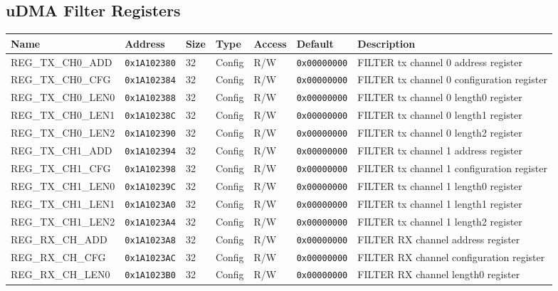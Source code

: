 
\subsection{uDMA Filter Registers}
{\small
\begin{tabularx}{\textwidth}{|l|l|l|l|l|l|X|}
  \hline
  \textbf{Name} & \textbf{Address}  & \textbf{Size} & \textbf{Type} & \textbf{Access} & \textbf{Default} & \textbf{Description} \\
  \hline
  REG\_TX\_CH0\_ADD & \texttt{0x1A102380} & 32 & Config & R/W & \texttt{0x00000000} & FILTER tx channel 0 address register\\
  \hline
  REG\_TX\_CH0\_CFG & \texttt{0x1A102384} & 32 & Config & R/W & \texttt{0x00000000} & FILTER tx channel 0 configuration register\\
  \hline
  REG\_TX\_CH0\_LEN0 & \texttt{0x1A102388} & 32 & Config & R/W & \texttt{0x00000000} & FILTER tx channel 0 length0 register\\
  \hline
  REG\_TX\_CH0\_LEN1 & \texttt{0x1A10238C} & 32 & Config & R/W & \texttt{0x00000000} & FILTER tx channel 0 length1 register\\
  \hline
  REG\_TX\_CH0\_LEN2 & \texttt{0x1A102390} & 32 & Config & R/W & \texttt{0x00000000} & FILTER tx channel 0 length2 register\\
  \hline
  REG\_TX\_CH1\_ADD & \texttt{0x1A102394} & 32 & Config & R/W & \texttt{0x00000000} & FILTER tx channel 1 address register\\
  \hline
  REG\_TX\_CH1\_CFG & \texttt{0x1A102398} & 32 & Config & R/W & \texttt{0x00000000} & FILTER tx channel 1 configuration register\\
  \hline
  REG\_TX\_CH1\_LEN0 & \texttt{0x1A10239C} & 32 & Config & R/W & \texttt{0x00000000} & FILTER tx channel 1 length0 register\\
  \hline
  REG\_TX\_CH1\_LEN1 & \texttt{0x1A1023A0} & 32 & Config & R/W & \texttt{0x00000000} & FILTER tx channel 1 length1 register\\
  \hline
  REG\_TX\_CH1\_LEN2 & \texttt{0x1A1023A4} & 32 & Config & R/W & \texttt{0x00000000} & FILTER tx channel 1 length2 register\\
  \hline
  REG\_RX\_CH\_ADD & \texttt{0x1A1023A8} & 32 & Config & R/W & \texttt{0x00000000} & FILTER RX channel address register\\
  \hline
  REG\_RX\_CH\_CFG & \texttt{0x1A1023AC} & 32 & Config & R/W & \texttt{0x00000000} & FILTER RX channel configuration register\\
  \hline
  REG\_RX\_CH\_LEN0 & \texttt{0x1A1023B0} & 32 & Config & R/W & \texttt{0x00000000} & FILTER RX channel length0 register\\

\end{tabularx}}
